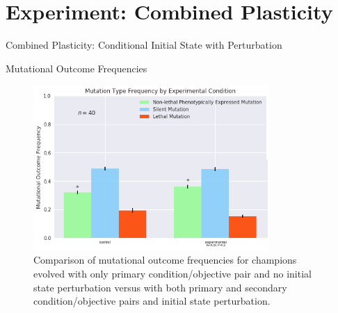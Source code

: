 \section{Experiment: Combined Plasticity}

\begin{frame}{Combined Plasticity: Conditional Initial State with Perturbation}

\end{frame}

\begin{frame}{Mutational Outcome Frequencies}
\begin{figure}
    \centering
    \includegraphics[width=0.8\textwidth]{img/mutation_type_combined}
 	\captionsetup{singlelinecheck=off,justification=raggedright}
  	\caption{Comparison of mutational outcome frequencies for champions evolved with only primary condition/objective pair and no initial state perturbation versus with both primary and secondary condition/objective pairs and initial state perturbation.}
    \label{fig:mutation_type_combined}
\end{figure}
\end{frame}